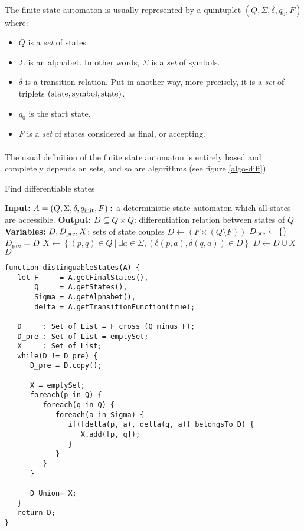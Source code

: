 \paragraph{}
The finite state automaton is usually represented by a quintuplet $(Q, \Sigma, \delta, q_0, F)$ where:
\begin{itemize}
   \item{$ Q $ is a \emph{set} of states.}
   \item{$ \Sigma $ is an alphabet. In other words, $ \Sigma $ is a \emph{set} of symbols.}
   \item{$ \delta $ is a transition relation. Put in another way, more precisely, it is a \emph{set} of triplets $(\rm{state}, \rm{symbol}, \rm{state})$.}
   \item{$ q_0 $ is the start state.}
   \item{$ F $ is a \emph{set} of states considered as final, or accepting.}
\end{itemize}

\paragraph{}
The usual definition of the finite state automaton is entirely based and completely depends on sets, and so are algorithms (see figure \ref{algo-diff})

\begin{algorithm}
   \caption{Find differentiable states}
   \label{algo-diff}
   \begin{algorithmic}
      \State \textbf{Input:} $A=(Q, \Sigma, \delta, q_{\rm{init}}, F):$ a deterministic state automaton which all states are accessible.
      \State \textbf{Output:} $D\subseteq Q \times Q$: differentiation relation between states of $ Q $
      \State \textbf{Variables:} $D, D_{\rm{pre}}, X$: sets of state couples
      \State $D \gets \left(F\times (Q \setminus F)\right)$
      \State $D_{\rm{pre}} \gets \{\}$
        \State $D_{\rm{pre}}=D$
        \State $X \gets \left\{(p,q) \in Q\: | \: \exists a \in \Sigma, \left(\delta(p,a), \delta(q,a)\right) \in D\right\}$
        \State $D \gets D \cup X$
      \EndWhile
      \State \Return $D$
   \end{algorithmic}
\end{algorithm}

\lstset{language=JavaScript}

\begin{lstlisting}
function distinguableStates(A) {
   let F     = A.getFinalStates(),
       Q     = A.getStates(),
       Sigma = A.getAlphabet(),
       delta = A.getTransitionFunction(true);

   D     : Set of List = F cross (Q minus F);
   D_pre : Set of List = emptySet;
   X     : Set of List;
   while(D != D_pre) {
      D_pre = D.copy();

      X = emptySet;
      foreach(p in Q) {
         foreach(q in Q) {
            foreach(a in Sigma) {
               if([delta(p, a), delta(q, a)] belongsTo D) {
                  X.add([p, q]);
               }
            }
         }
      }

      D Union= X;
   }
   return D;
}
\end{lstlisting}

